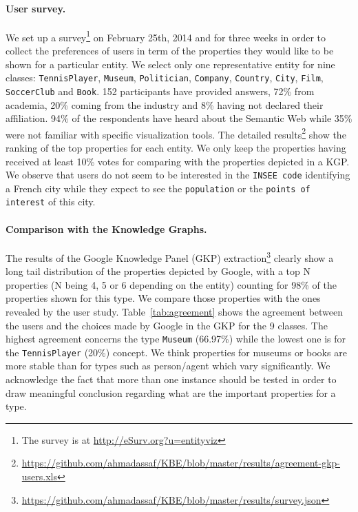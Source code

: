 \paragraph{\textbf{User survey.}}
\label{sec:survey}
We set up a survey\footnote{The survey is at \url{http://eSurv.org?u=entityviz}} on February 25th, 2014 and for three weeks in order to collect the preferences of users in term of the properties they would like to be shown for a particular entity. We select only one representative entity for nine classes: \texttt{TennisPlayer}, \texttt{Museum}, \texttt{Politician}, \texttt{Company}, \texttt{Country}, \texttt{City}, \texttt{Film}, \texttt{SoccerClub} and \texttt{Book}. 152 participants have provided answers, 72\% from academia, 20\% coming from the industry and 8\% having not declared their affiliation. 94\% of the respondents have heard about the Semantic Web while 35\% were not familiar with specific visualization tools. The detailed results\footnote{\url{https://github.com/ahmadassaf/KBE/blob/master/results/agreement-gkp-users.xls}} show the ranking of the top properties for each entity. We only keep the properties having received at least 10\% votes for comparing with the properties depicted in a KGP. We observe that users do not seem to be interested in the \texttt{INSEE code} identifying a French city while they expect to see the \texttt{population} or the \texttt{points of interest} of this city.
\paragraph{\textbf{Comparison with the Knowledge Graphs.}}
\label{sec:comparison}
The results of the Google Knowledge Panel (GKP) extraction\footnote{\url{https://github.com/ahmadassaf/KBE/blob/master/results/survey.json}} clearly show a long tail distribution of the properties depicted by Google, with a top N properties (N being 4, 5 or 6 depending on the entity) counting for 98\% of the properties shown for this type. We compare those properties with the ones revealed by the user study. Table~\ref{tab:agreement} shows the agreement between the users and the choices made by Google in the GKP for the 9 classes. The highest agreement concerns the type \texttt{Museum} (66.97\%) while the lowest one is for the \texttt{TennisPlayer} (20\%) concept. We think properties for museums or books are more stable than for types such as person/agent which vary significantly. We acknowledge the fact that more than one instance should be tested in order to draw meaningful conclusion regarding what are the important properties for a type.
\begin{table}[!htp]
\end{table}\normalsize


